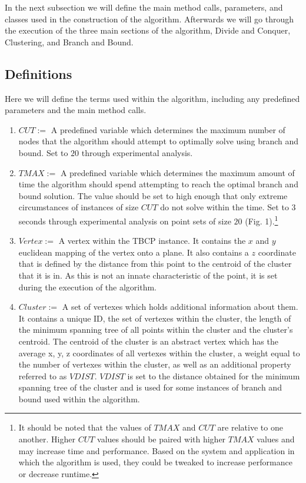 \documentclass[sigconf, anonymous, pdftex]{acmart}
\begin{document}
In the next subsection we will define the main method calls, parameters, and classes used in the construction of the algorithm. Afterwards we will go through the execution of the three main sections of the algorithm, Divide and Conquer, Clustering, and Branch and Bound.

\subsection{Definitions}

Here we will define the terms used within the algorithm, including any predefined parameters and the main method calls.

\begin{enumerate}
    \item $CUT :=$ A predefined variable which determines the maximum number of nodes that the algorithm should attempt to optimally solve using branch and bound. Set to $20$ through experimental analysis.
    
    \item $TMAX :=$ A predefined variable which determines the maximum amount of time the algorithm should spend attempting to reach the optimal branch and bound solution. The value should be set to high enough that only extreme circumstances of instances of size $CUT$ do not solve within the time. Set to $3$ seconds through experimental analysis on point sets of size $20$ (Fig. 1).\footnote{It should be noted that the values of $TMAX$ and $CUT$ are relative to one another. Higher $CUT$ values should be paired with higher $TMAX$ values and may increase time and performance. Based on the system and application in which the algorithm is used, they could be tweaked to increase performance or decrease runtime.}
    
    \item $Vertex :=$ A vertex within the TBCP instance. It contains the $x$ and $y$ euclidean mapping of the vertex onto a plane. It also contains a $z$ coordinate that is defined by the distance from this point to the centroid of the cluster that it is in. As this is not an innate characteristic of the point, it is set during the execution of the algorithm.
    
    \item $Cluster :=$ A set of vertexes which holds additional information about them. It contains a unique ID, the set of vertexes within the cluster, the length of the minimum spanning tree of all points within the cluster and the cluster's centroid. The centroid of the cluster is an abstract vertex which has the average x, y, z coordinates of all vertexes within the cluster, a weight equal to the number of vertexes within the cluster, as well as an additional property referred to as $VDIST$. $VDIST$ is set to the distance obtained for the minimum spanning tree of the cluster and is used for some instances of branch and bound used within the algorithm.
    

\end{enumerate}
\end{document}
